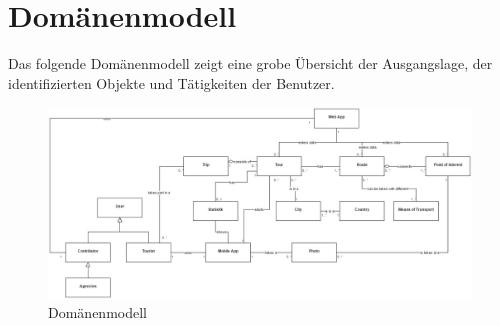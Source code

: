 \documentclass[a4paper,10pt,xetex]{article}
\begin{document}
\section{Domänenmodell}\label{domaenenmodell}
Das folgende Domänenmodell zeigt eine grobe Übersicht der Ausgangslage,
der identifizierten Objekte und Tätigkeiten der Benutzer.

\begin{figure}
  \centering
  \includegraphics{domain_model1}
  \caption{Domänenmodell}
\end{figure}
\end{document}
